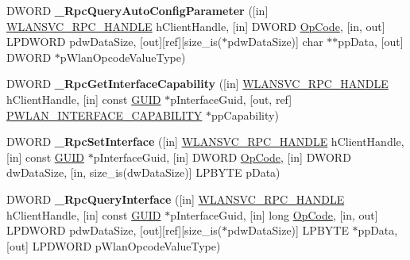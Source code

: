 \begin{DoxyCompactItemize}
\item 
\mbox{\label{interfacewlansvc__interface_a0d82ee6d025a8020a481ed77118cc89d}} 
D\+W\+O\+RD {\bfseries \+\_\+\+Rpc\+Query\+Auto\+Config\+Parameter} (\mbox{[}in\mbox{]} \hyperlink{interfacevoid}{W\+L\+A\+N\+S\+V\+C\+\_\+\+R\+P\+C\+\_\+\+H\+A\+N\+D\+LE} h\+Client\+Handle, \mbox{[}in\mbox{]} D\+W\+O\+RD \hyperlink{dlist_8c_abeb7dfb0e9e2b3114e240a405d046ea7}{Op\+Code}, \mbox{[}in, out\mbox{]} L\+P\+D\+W\+O\+RD pdw\+Data\+Size, \mbox{[}out\mbox{]}\mbox{[}ref\mbox{]}\mbox{[}size\+\_\+is($\ast$pdw\+Data\+Size)\mbox{]} char $\ast$$\ast$pp\+Data, \mbox{[}out\mbox{]} D\+W\+O\+RD $\ast$p\+Wlan\+Opcode\+Value\+Type)
\item 
\mbox{\label{interfacewlansvc__interface_a1b6caf086dd10dab3e19f72d25cb5710}} 
D\+W\+O\+RD {\bfseries \+\_\+\+Rpc\+Get\+Interface\+Capability} (\mbox{[}in\mbox{]} \hyperlink{interfacevoid}{W\+L\+A\+N\+S\+V\+C\+\_\+\+R\+P\+C\+\_\+\+H\+A\+N\+D\+LE} h\+Client\+Handle, \mbox{[}in\mbox{]} const \hyperlink{interface_g_u_i_d}{G\+U\+ID} $\ast$p\+Interface\+Guid, \mbox{[}out, ref\mbox{]} \hyperlink{struct___w_l_a_n___i_n_t_e_r_f_a_c_e___c_a_p_a_b_i_l_i_t_y}{P\+W\+L\+A\+N\+\_\+\+I\+N\+T\+E\+R\+F\+A\+C\+E\+\_\+\+C\+A\+P\+A\+B\+I\+L\+I\+TY} $\ast$pp\+Capability)
\item 
\mbox{\label{interfacewlansvc__interface_a0dcd00c516292db7fbf2789e203b7285}} 
D\+W\+O\+RD {\bfseries \+\_\+\+Rpc\+Set\+Interface} (\mbox{[}in\mbox{]} \hyperlink{interfacevoid}{W\+L\+A\+N\+S\+V\+C\+\_\+\+R\+P\+C\+\_\+\+H\+A\+N\+D\+LE} h\+Client\+Handle, \mbox{[}in\mbox{]} const \hyperlink{interface_g_u_i_d}{G\+U\+ID} $\ast$p\+Interface\+Guid, \mbox{[}in\mbox{]} D\+W\+O\+RD \hyperlink{dlist_8c_abeb7dfb0e9e2b3114e240a405d046ea7}{Op\+Code}, \mbox{[}in\mbox{]} D\+W\+O\+RD dw\+Data\+Size, \mbox{[}in, size\+\_\+is(dw\+Data\+Size)\mbox{]} L\+P\+B\+Y\+TE p\+Data)
\item 
\mbox{\label{interfacewlansvc__interface_a9eac5dc80a73c45117e37a74786a7721}} 
D\+W\+O\+RD {\bfseries \+\_\+\+Rpc\+Query\+Interface} (\mbox{[}in\mbox{]} \hyperlink{interfacevoid}{W\+L\+A\+N\+S\+V\+C\+\_\+\+R\+P\+C\+\_\+\+H\+A\+N\+D\+LE} h\+Client\+Handle, \mbox{[}in\mbox{]} const \hyperlink{interface_g_u_i_d}{G\+U\+ID} $\ast$p\+Interface\+Guid, \mbox{[}in\mbox{]} long \hyperlink{dlist_8c_abeb7dfb0e9e2b3114e240a405d046ea7}{Op\+Code}, \mbox{[}in, out\mbox{]} L\+P\+D\+W\+O\+RD pdw\+Data\+Size, \mbox{[}out\mbox{]}\mbox{[}ref\mbox{]}\mbox{[}size\+\_\+is($\ast$pdw\+Data\+Size)\mbox{]} L\+P\+B\+Y\+TE $\ast$pp\+Data, \mbox{[}out\mbox{]} L\+P\+D\+W\+O\+RD p\+Wlan\+Opcode\+Value\+Type)
$$
\end{DoxyCompactItemize}
